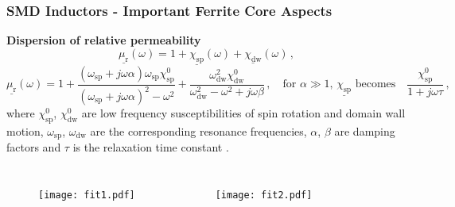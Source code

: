 \begin{frame}
	\frametitle{SMD Inductors - Important Ferrite Core Aspects}
	\textbf{Dispersion of relative permeability}
	\begin{equation} \label{eqn:disp1}
		\underline{\mu_\mathrm{r}}(\omega) = 1 + \underline{\chi_\mathrm{sp}}(\omega)  +  \underline{\chi_\mathrm{dw}}(\omega)\,,
	\end{equation}
	\begin{equation} \label{eqn:disp2}
		\underline{\mu_\mathrm{r}}(\omega) = 1 + \frac{(\omega_\mathrm{sp}+j\omega\alpha)\omega_\mathrm{sp}\chi_\mathrm{sp}^0}{(\omega_\mathrm{sp}+j\omega\alpha)^2-\omega^2} +  \frac{\omega_\mathrm{dw}^2\chi_\mathrm{dw}^0}{\omega_\mathrm{dw}^2-\omega^2+j\omega\beta}\,,
		\quad \text{for } \alpha \gg 1,\, \underline{\chi_\mathrm{sp}}\text{ becomes} \quad
		\frac{\chi_\mathrm{sp}^0}{1+j\omega\tau}\,,
	\end{equation}
	where $\chi_\mathrm{sp}^0$, $\chi_\mathrm{dw}^0$ are low frequency susceptibilities of spin rotation and domain wall motion, $\omega_\mathrm{sp}$, $\omega_\mathrm{dw}$ are the corresponding resonance frequencies, $\alpha$, $\beta$ are damping factors and $\tau$ is the relaxation time constant \cite{landau, tsutaoka, aee423}.
	\vspace{-15pt}
	\begin{columns}
		\begin{figure}
			\texttt{[image: fit1.pdf]}
		\end{figure}
		\begin{figure}
			\texttt{[image: fit2.pdf]}
		\end{figure}
		\vspace{1.25em}
	\end{columns}
\end{frame}

